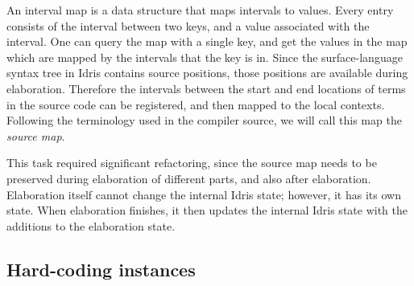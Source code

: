 An interval map is a data structure that maps
intervals to values. Every entry consists of the interval between two keys, and
a value associated with the interval. One can query the map with a single
key, and get the values in the map which are mapped by the intervals that
the key is in.  Since the surface-language syntax tree in Idris contains source
positions, those positions are available during elaboration.  Therefore the
intervals between the start and end locations of terms in the source code can
be registered, and then mapped to the local contexts.  Following the
terminology used in the compiler source, we will call this map the
\emph{source map}.

This task required significant refactoring, since the source map
needs to be preserved during elaboration of different parts, and also after
elaboration. Elaboration itself cannot change the internal Idris state;
however, it has its own state.  When elaboration finishes, it then updates the
internal Idris state with the additions to the elaboration state.

\subsection{Hard-coding \Editorable{} instances}

